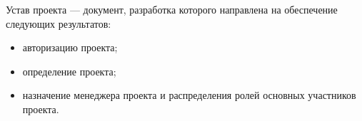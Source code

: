 Устав проекта --- документ, разработка которого направлена на обеспечение следующих результатов:
\begin{itemize}
	\setlength\itemsep{0pt}
	\item авторизацию проекта;
\item определение проекта;
\item назначение менеджера проекта и распределения ролей основных участников проекта.
\end{itemize}








